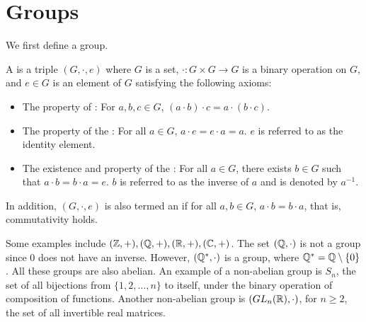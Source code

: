 \section{Groups}
We first define a group.
\begin{definition}
    A  is a triple $(G, \cdot, e)$ where $G$ is a set, $\cdot: G \times G \to G$ is a binary operation on $G$, and $e \in G$ is an element of $G$ satisfying the following axioms:
    \begin{itemize}
        \item The property of : For $a,b,c \in G$, $(a \cdot b) \cdot c = a \cdot (b \cdot c)$.
        \item The property of the : For all $a \in G$, $a \cdot e = e \cdot a = a$. $e$ is referred to as the identity element.
        \item The existence and property of the : For all $a \in G$, there exists $b \in G$ such that $a \cdot b = b \cdot a = e$. $b$ is referred to as the inverse of $a$ and is denoted by $a^{-1}$.
    \end{itemize}
    In addition, $(G,\cdot,e)$ is also termed an  if for all $a,b \in G$, $a \cdot b = b \cdot a$, that is, commutativity holds.
\end{definition}
Some examples include $(\mathbb{Z}, +), (\mathbb{Q}, +), (\mathbb{R}, +), (\mathbb{C}, +)$. The set $(\mathbb{Q}, \cdot)$ is not a group since $0$ does not have an inverse. However, $(\mathbb{Q}^{\ast}, \cdot)$ is a group, where $\mathbb{Q}^{\ast} = \mathbb{Q}\setminus\{0\}$. All these groups are also abelian. An example of a non-abelian group is $S_{n}$, the set of all bijections from $\{1,2,\ldots,n\}$ to itself, under the binary operation of composition of functions. Another non-abelian group is $(GL_{n}(\mathbb{R}), \cdot)$, for $n \geq 2$, the set of all invertible real matrices.